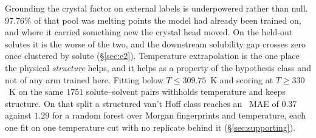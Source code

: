 
Grounding the crystal factor on external labels is underpowered rather
than null. $97.76\%$ of that pool was melting points the model had already been trained on, and
where it carried something new the crystal head moved. On the held-out solutes it is the worse of
the two, and the downstream solubility gap crosses zero once clustered by solute
(\S\ref{sec:e2}). Temperature extrapolation is the one place the physical \emph{structure} helps,
and it helps as a property of the hypothesis class and not of any arm trained here. Fitting
below $T\le309.75$~K and scoring at $T\ge330$~K on the same $1751$ solute--solvent pairs withholds
temperature and keeps structure. On that split a structured van't Hoff class reaches an \lnx\ MAE
of $0.37$ against $1.29$ for a random forest over Morgan fingerprints and temperature, each one fit
on one temperature cut with no replicate behind it (\S\ref{sec:supporting}).


